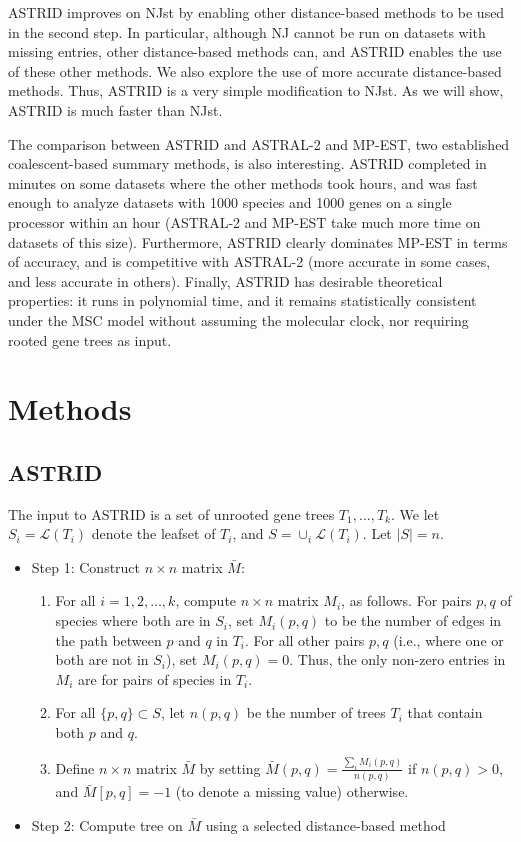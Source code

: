 ASTRID improves on NJst  by
enabling other distance-based methods to be used in the second
step. In particular, although NJ cannot be run on datasets with missing
entries, other distance-based methods can, and ASTRID enables the use
of these other methods. We also explore the use of more accurate
distance-based methods. Thus, ASTRID is a very simple modification to NJst.
As we will show, ASTRID is much faster than NJst.

The comparison between ASTRID and ASTRAL-2 and MP-EST, two
established coalescent-based summary methods, is also interesting.
ASTRID
completed in minutes on some datasets where the other methods took hours, and
was fast enough to analyze datasets with 1000 species and 1000 genes on
a single processor within an hour (ASTRAL-2 and MP-EST take much more
time on datasets of this size).
Furthermore, 
ASTRID clearly dominates MP-EST in
terms of accuracy, and is competitive with ASTRAL-2 
(more accurate in some cases, and less accurate in others). 
Finally, ASTRID has desirable theoretical properties: 
it runs in polynomial time, and it remains 
statistically consistent under
the MSC model without assuming the molecular clock, nor requiring rooted gene
trees as input. 



\section{Methods}

\subsection{ASTRID}


The input to ASTRID is
a set of unrooted gene trees $T_1, \ldots, T_k$. We let 
$S_i=\mathcal{L}(T_i)$ denote the leafset of $T_i$, and
$S = \cup_i \mathcal{L}(T_i)$. Let $|S|=n$.

\begin{itemize}
\item[]{Step 1: Construct $n \times n$  matrix $\bar M$:}
\begin{enumerate}
\item For all $i=1,2,\ldots, k$, compute
$n \times n$ matrix $M_i$,
as follows. For pairs $p,q$  of species where both are
in  $S_i$, set $M_i(p,q)$ to be the
number of edges in
the path between $p$ and $q$ in $T_i$. 
For all other pairs $p,q$ (i.e., where
one or both are not in $S_i$), set $M_i(p,q) = 0$.
Thus, the only non-zero entries in $M_i$ are for pairs of
species in $T_i$.
\item For all $\{p,q\} \subset S$, let $n(p,q)$ be the
number of trees $T_i$ that contain both $p$ and $q$. 
\item Define $n \times n$ matrix  $\bar M$ by
setting $\bar M(p, q) =
\frac{\sum_i M_i(p,q)}{n(p,q)}$ if $n(p,q) >0$, and
  $\bar M[p,q] = -1$ (to denote a missing value) otherwise.
\end{enumerate}
\item[]{Step 2: Compute tree on $\bar M$ using a selected distance-based method}
\end{itemize}


